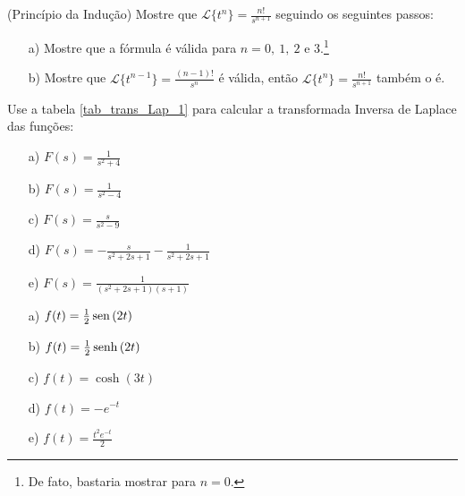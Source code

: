  \begin{Exercise}\label{inducao_tn}(Princípio da Indução) Mostre que $\displaystyle\mathcal{L}\{t^n\}=\frac{n!}{s^{n+1}}$ seguindo os seguintes passos:
 \begin{itemize}
  \item[a)] Mostre que a fórmula é válida para $n=0,\ 1,\ 2$ e $3$.\footnote{De fato, bastaria mostrar para $n=0$.}
  \item[b)] Mostre que $\displaystyle\mathcal{L}\{t^{n-1}\}=\frac{(n-1)!}{s^{n}}$ é válida, então $\displaystyle\mathcal{L}\{t^n\}=\frac{n!}{s^{n+1}}$ também o é.
 \end{itemize}

  
 \end{Exercise}

 
 \begin{Exercise}Use a tabela \ref{tab_trans_Lap_1} para calcular a transformada Inversa de Laplace das funções:
 \begin{itemize}
  \item[a)] $F(s)=\frac{1}{s^2+4}$
  \item[b)] $F(s)=\frac{1}{s^2-4}$
  \item[c)] $F(s)=\frac{s}{s^2-9}$
  \item[d)] $F(s)=-\frac{s}{s^2+2s+1}-\frac{1}{s^2+2s+1}$ 
  \item[e)] $F(s)=\frac{1}{(s^2+2s+1)(s+1)}$ 
 \end{itemize}
 
\end{Exercise}
\begin{resp}
 \begin{itemize}
  \item[a)] $f(t)=\frac{1}{2}\operatorname{sen}\,(2t)$
  \item[b)] $f(t)=\frac{1}{2}\operatorname{senh}\,(2t)$ 
  \item[c)] $f(t)=\cosh(3t)$
  \item[d)] $f(t)=-e^{-t}$ 
  \item[e)] $f(t)=\frac{t^2e^{-t}}{2}$ 
  \end{itemize}

\end{resp}
%